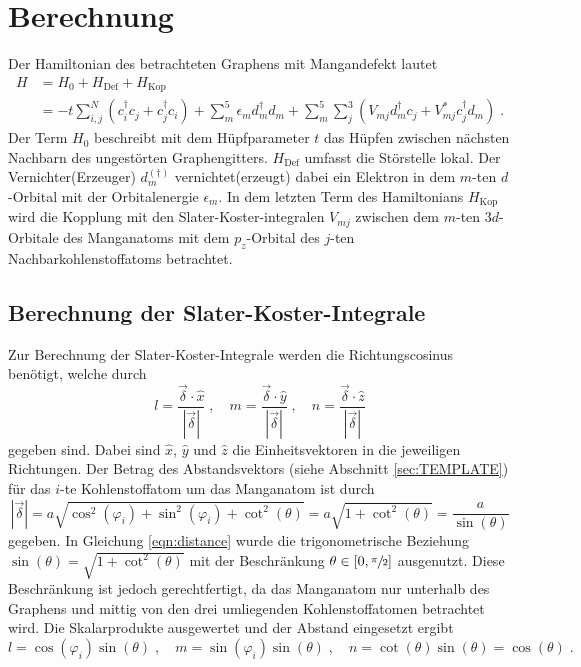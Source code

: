 \chapter{Berechnung}
\label{chap:berechnung}
Der Hamiltonian des betrachteten Graphens mit Mangandefekt lautet
\begin{align}
   H &=  H_0 + H_\text{Def} + H_\text{Kop}\\
    &=- t \sum_{i,j}^N \left ( c_i^\dagger c_j + c_j^\dagger c_i \right )  + \sum_m^5 \epsilon_m d_m^\dagger d_m
    + \sum_m^5 \sum_j^3 \left ( V_{mj} d_m^\dagger c_j + V^*_{mj} c_j^\dagger d_m \right )  \; \text{.} \label{eqn:full_Hamiltonian}
\end{align}
Der Term $H_0$ beschreibt mit dem Hüpfparameter $t$ das Hüpfen zwischen nächsten Nachbarn des ungestörten Graphengitters.
$H_\text{Def}$ umfasst die Störstelle lokal. Der Vernichter(Erzeuger) $d_m^{(\dagger)}$ vernichtet(erzeugt) dabei ein
Elektron in dem $m$-ten $d$-Orbital mit der Orbitalenergie\cite{anders-fkt} $\epsilon_m$.
In dem letzten Term des Hamiltonians $H_\text{Kop}$ wird die Kopplung mit den Slater-Koster-integralen
$V_{mj}$ zwischen dem $m$-ten $3d$-Orbitale des Manganatoms mit dem $p_z$-Orbital des $j$-ten Nachbarkohlenstoffatoms betrachtet.

\section{Berechnung der Slater-Koster-Integrale}
\label{sec:slaterkostercalc}
Zur Berechnung der Slater-Koster-Integrale werden die Richtungscosinus benötigt, welche durch
\begin{equation*}
    l = \frac{\vec{\delta} \cdot \hat{x}}{\left | \vec{\delta} \right |} \; , \quad
    m = \frac{\vec{\delta} \cdot \hat{y}}{\left | \vec{\delta} \right |} \; , \quad
    n = \frac{\vec{\delta} \cdot \hat{z}}{\left | \vec{\delta} \right |}
\end{equation*}
gegeben sind.
Dabei sind $\hat{x}$, $\hat{y}$ und $\hat{z}$ die Einheitsvektoren in die jeweiligen Richtungen. 
Der Betrag des Abstandsvektors (siehe Abschnitt \ref{sec:TEMPLATE}) für das $i$-te Kohlenstoffatom um das Manganatom ist durch 
\begin{equation*}
    \left | \vec{\delta} \right | = a \sqrt{\cos^2(\varphi_i) + \sin^2(\varphi_i) + \cot^2(\theta)} = a \sqrt{1+\cot^2(\theta)} = \frac{a}{\sin(\theta)} \label{eqn:distance}
\end{equation*}
gegeben.
In Gleichung \eqref{eqn:distance} wurde die trigonometrische Beziehung $\sin(\theta) = \sqrt{1+\cot^2(\theta)}$ \cite{trig} mit der Beschränkung
$\theta \in [ 0, \sfrac{\pi}{2} ] $ ausgenutzt. 
Diese Beschränkung ist jedoch gerechtfertigt, da das Manganatom nur unterhalb des Graphens und mittig von den drei umliegenden Kohlenstoffatomen betrachtet wird.
Die Skalarprodukte ausgewertet und der Abstand eingesetzt ergibt
\begin{equation*}
    l = \cos(\varphi_i) \sin(\theta) \; , \quad
    m = \sin(\varphi_i) \sin(\theta) \; , \quad
    n = \cot(\theta) \sin(\theta) = \cos(\theta) \; .
\end{equation*}



